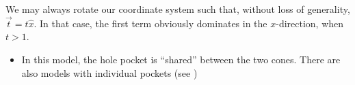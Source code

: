 \begin{Proof}
  We may always rotate our coordinate system such that, without loss of generality, \(\vec{t} = t \hat{x}\).
  In that case, the first term obviously dominates in the \(x\)-direction, when $t>1$.
\end{Proof}

\begin{itemize}
  \item In this model, the hole pocket is ``shared'' between the two cones. There are also models with individual pockets (see \cite{mccormickMinimalModelsTopological2017})
\end{itemize}



